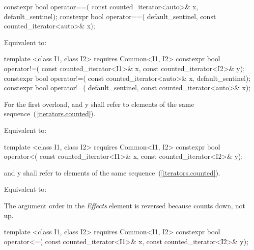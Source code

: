 \begin{itemdecl}
  constexpr bool operator==(
    const counted_iterator<auto>& x, default_sentinel);
  constexpr bool operator==(
    default_sentinel, const counted_iterator<auto>& x);
\end{itemdecl}

\begin{itemdescr}
\pnum
\effects Equivalent to:
\end{itemdescr}

%
%
\begin{itemdecl}
template <class I1, class I2>
    requires Common<I1, I2>
  constexpr bool operator!=(
    const counted_iterator<I1>& x, const counted_iterator<I2>& y);
  constexpr bool operator!=(
    const counted_iterator<auto>& x, default_sentinel);
  constexpr bool operator!=(
    default_sentinel, const counted_iterator<auto>& x);
\end{itemdecl}

\begin{itemdescr}
\pnum
\requires For the first overload,  and {y} shall refer to
elements of the same sequence~(\ref{iterators.counted}).

\pnum
\effects Equivalent to:
\end{itemdescr}

%
%
\begin{itemdecl}
template <class I1, class I2>
    requires Common<I1, I2>
  constexpr bool operator<(
    const counted_iterator<I1>& x, const counted_iterator<I2>& y);
\end{itemdecl}

\begin{itemdescr}
\pnum
\requires {} and {y} shall refer to
elements of the same sequence~(\ref{iterators.counted}).

\pnum
\effects Equivalent to:

\pnum
\enternote The argument order in the \textit{Effects} element is reversed because 
counts down, not up. \exitnote

\end{itemdescr}

%
%
\begin{itemdecl}
template <class I1, class I2>
    requires Common<I1, I2>
  constexpr bool operator<=(
    const counted_iterator<I1>& x, const counted_iterator<I2>& y);
\end{itemdecl}

